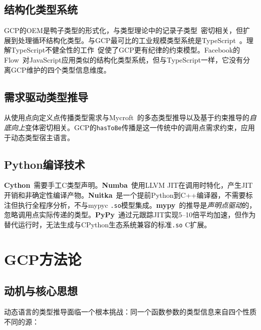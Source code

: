 \documentclass[UTF8]{article}
\begin{document}
\subsection{结构化类型系统}

GCP的OEM是鸭子类型的形式化，与类型理论中的记录子类型~\cite{pierce2002}密切相关，但扩展到处理循环结构化类型。与GCP最可比的工业规模类型系统是TypeScript~\cite{typescript2012}。理解TypeScript不健全性的工作~\cite{bierman2014}促使了GCP更有纪律的约束模型。Facebook的Flow~\cite{flow2017}对JavaScript应用类似的结构化类型系统，但与TypeScript一样，它没有分离GCP维护的四个类型信息维度。

\subsection{需求驱动类型推导}

从使用点向定义点传播类型需求与Mycroft~\cite{mycroft1984}的多态类型推导以及基于约束推导的\emph{自底向上}变体密切相关。GCP的\texttt{hasToBe}传播是这一传统中的调用点需求约束，应用于动态类型宿主语言。

\subsection{Python编译技术}

\textbf{Cython}~\cite{cython2007}需要手工C类型声明。\textbf{Numba}~\cite{numba2015}使用LLVM JIT在调用时特化，产生JIT开销和非确定性编译产物。\textbf{Nuitka}~\cite{nuitka2012}是一个提前Python到C++编译器，不需要标注但执行全程序分析，不与mypyc \texttt{.so}模型集成。\textbf{mypy}~\cite{mypy2012}的推导是\emph{声明点驱动}的，忽略调用点实际传递的类型。\textbf{PyPy}~\cite{pypy2009}通过元跟踪JIT实现5--10倍平均加速，但作为替代运行时，无法生成与CPython生态系统兼容的标准\texttt{.so} C扩展。

\section{GCP方法论}
\label{sec:gcp}

\subsection{动机与核心思想}
\label{sec:motivation}

动态语言的类型推导面临一个根本挑战：同一个函数参数的类型信息来自四个性质不同的源：
\end{document}
